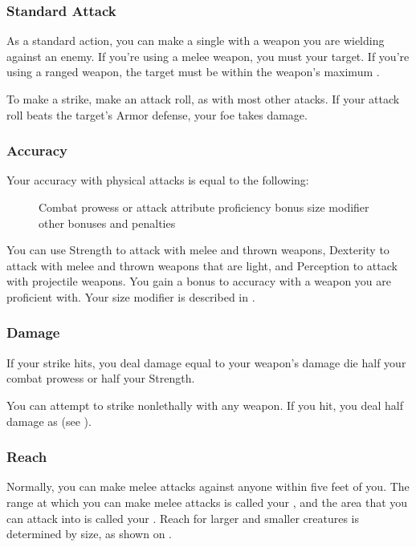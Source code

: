 \subsubsection{Standard Attack}\label{Standard Attack}
As a standard action, you can make a single  with a weapon you are wielding against an enemy.
If you're using a melee weapon, you must  your target.
If you're using a ranged weapon, the target must be within the weapon's maximum .

To make a strike, make an attack roll, as with most other atacks.
If your attack roll beats the target's Armor defense, your foe takes damage.

\subsubsection{Accuracy}
Your accuracy with physical attacks is equal to the following:

\begin{figure}[h]
    \centering Combat prowess or attack attribute \add proficiency bonus \add size modifier \add other bonuses and penalties
\end{figure}

 You can use Strength to attack with melee and thrown weapons, Dexterity to attack with melee and thrown weapons that are light, and Perception to attack with projectile weapons.
 You gain a  bonus to accuracy with a weapon you are proficient with.
 Your size modifier is described in .

\subsubsection{Damage}
If your strike hits, you deal damage equal to your weapon's damage die \add half your combat prowess or half your Strength.

 You can attempt to strike nonlethally with any weapon.
If you hit, you deal half damage as  (see ).

\subsubsection{Reach}\label{Reach}
Normally, you can make melee attacks against anyone within five feet of you.
The range at which you can make melee attacks is called your , and the area that you can attack into is called your .
Reach for larger and smaller creatures is determined by size, as shown on .

